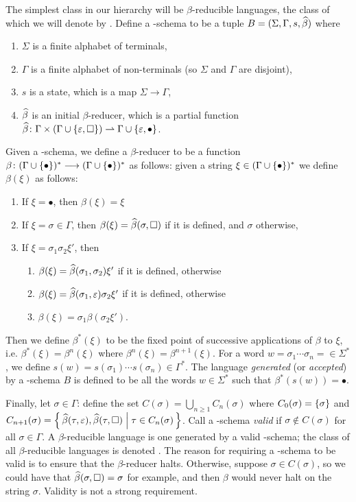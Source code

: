 \documentclass{llncs}
\begin{document}
The simplest class in our hierarchy will be $\beta$-reducible languages, the class of which we will denote by \BR.
Define a \BR-schema to be a tuple $B=(\Sigma,\Gamma,s,\widehat\beta)$ where
\begin{enumerate}
    \item $\Sigma$ is a finite alphabet of terminals,
    \item $\Gamma$ is a finite alphabet of non-terminals (so $\Sigma$ and $\Gamma$ are disjoint),
    \item $s$ is a state, which is a map $\Sigma\to\Gamma$,
    \item $\widehat\beta$ is an initial $\beta$-reducer, which is a partial function $\hb\colon\Gamma\times(\Gamma\cup\set{\epsilon,\square})\partial\Gamma\cup\set{\epsilon,\bullet}$.
\end{enumerate}
Given a \BR-schema, we define a $\beta$-reducer to be a function $\beta\colon(\Gamma\cup\set\bullet)^*\longto(\Gamma\cup\set\bullet)^*$ as follows: given a string $\xi\in(\Gamma\cup\set\bullet)^*$ we define $\beta(\xi)$ as follows:
\begin{enumerate}
    \item If $\xi=\bullet$, then $\beta(\xi)=\xi$
    \item If $\xi=\sigma\in\Gamma$, then $\beta(\xi)=\widehat\beta(\sigma,\square)$ if it is defined, and $\sigma$ otherwise,
    \item If $\xi=\sigma_1\sigma_2\xi'$, then
        \begin{enumerate}
            \item $\beta(\xi)=\widehat\beta(\sigma_1,\sigma_2)\xi'$ if it is defined, otherwise
            \item $\beta(\xi)=\widehat\beta(\sigma_1,\varepsilon)\sigma_2\xi'$ if it is defined, otherwise
            \item $\beta(\xi)=\sigma_1\beta(\sigma_2\xi')$.
        \end{enumerate}
\end{enumerate}
Then we define $\beta^*(\xi)$ to be the fixed point of successive applications of $\beta$ to $\xi$, i.e. $\beta^*(\xi)=\beta^n(\xi)$ where $\beta^n(\xi)=\beta^{n+1}(\xi)$.
For a word $w=\sigma_1\cdots\sigma_n=\in\Sigma^*$, we define $s(w)=s(\sigma_1)\cdots s(\sigma_n)\in\Gamma^*$.
The language \textit{generated} (or \textit{accepted}) by a \BR-schema $B$ is defined to be all the words $w\in\Sigma^*$ such that $\beta^*(s(w))=\bullet$.

Finally, let $\sigma\in\Gamma$: define the set $C(\sigma)=\bigcup_{n\geq1}C_n(\sigma)$ where $C_0(\sigma)=\set\sigma$ and $C_{n+1}(\sigma)=\set{\hb(\tau,\epsilon),\hb(\tau,\square)}[\tau\in C_n(\sigma)]$.
Call a \BR-schema \textit{valid} if $\sigma\notin C(\sigma)$ for all $\sigma\in\Gamma$.
A $\beta$-reducible language is one generated by a valid \BR-schema; the class of all $\beta$-reducible languages is denoted \BR.
The reason for requiring a \BR-schema to be valid is to ensure that the $\beta$-reducer halts.
Otherwise, suppose $\sigma\in C(\sigma)$, so we could have that $\widehat\beta(\sigma,\square)=\sigma$ for example, and then $\beta$ would never halt on the string $\sigma$.
Validity is not a strong requirement.
\end{document}
